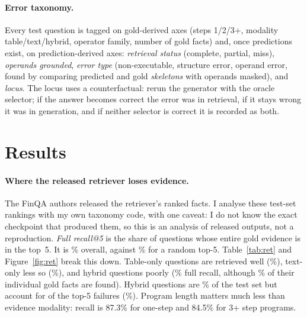 \documentclass{article}
\newcommand{\code}[1]{\texttt{#1}}
\begin{document}
\paragraph{Error taxonomy.} Every test question is tagged on gold-derived axes (steps 1/2/3+, modality table/text/hybrid, operator family, number of gold facts) and, once predictions exist, on prediction-derived axes: \emph{retrieval status} (complete, partial, miss), \emph{operands grounded}, \emph{error type} (non-executable, structure error, operand error, found by comparing predicted and gold \emph{skeletons} with operands masked), and \emph{locus}. The locus uses a counterfactual: rerun the generator with the oracle selector; if the answer becomes correct the error was in retrieval, if it stays wrong it was in generation, and if neither selector is correct it is recorded as both.

\section{Results}

\paragraph{Where the released retriever loses evidence.} The FinQA authors released the retriever's ranked facts. I analyse these test-set rankings with my own taxonomy code, with one caveat: I do not know the exact checkpoint that produced them, so this is an analysis of released outputs, not a reproduction. \emph{Full recall@5} is the share of questions whose entire gold evidence is in the top~5. It is \RelFull\% overall, against \RelChance\% for a random top-5. Table~\ref{tab:ret} and Figure~\ref{fig:ret} break this down. Table-only questions are retrieved well (\RelTable\%), text-only less so (\RelText\%), and hybrid questions poorly (\RelHybrid\% full recall, although \RelFactHybrid\% of their individual gold facts are found). Hybrid questions are \QShareHybrid\% of the test set but account for \NFailHybrid{} of the \NFailTotal{} top-5 failures (\FailShareHybrid\%). Program length matters much less than evidence modality: recall is 87.3\% for one-step and 84.5\% for 3+ step programs.

\begin{table}[h]
\centering\small

\caption{Released-retriever top-5 evidence recall on the test set, by taxonomy axis (\code{scripts/02\_retrieval\_analysis.py}).}\label{tab:ret}
\end{table}
\end{document}
